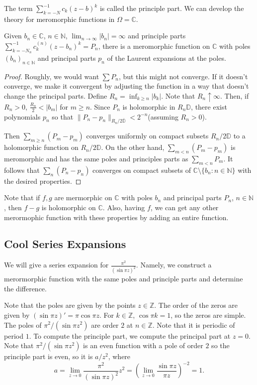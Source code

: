 \documentclass[12pt]{scrartcl}
\newcommand{\N}{\mathbb{N}}
\newcommand{\Z}{\mathbb{Z}}
\newcommand{\C}{\mathbb C}
\newcommand{\D}{\mathbb D}
\let \ol \overline
\begin{document}
The term $\sum_{k=-N}^{-1} c_k(z - b)^k$ is called the principle part.  We can develop the theory for meromorphic functions in $\Omega = \C$. 
\begin{theorem} Given $b_n \in \C$, $n \in \N$, $\lim_{n \to \infty} |b_n| = \infty$ and principle parts $\sum_{k = -N_n}^{-1} c_k^{(n)}(z - b_n)^k = P_n$, there is a meromorphic function on $\C$ with poles $(b_n)_{n \in \N}$ and principal parts $p_n$ of the Laurent expansions at the poles.
\end{theorem}
\begin{proof}
Roughly, we would want $\sum P_n$, but this might not converge.  If it doesn't converge, we make it convergent by adjusting the function in a way that doesn't change the principal parts.  Define $R_n = \inf_{k \ge n} |b_k|$.  Note that $R_n \uparrow \infty$.  Then, if $R_n > 0$, $\frac{R_n}{2} < |b_m|$ for $m \ge n$.  Since $P_n$ is holomorphic in $R_n\D$, there exist polynomials $p_n$ so that $\|P_n - p_n \|_{R_n/2 \ol{\D}} < 2^{-n}$(assuming $R_n > 0$).

Then $\sum_{m \ge n} (P_m - p_m)$ converges uniformly on compact subsets $R_n/2 \D$ to a holomorphic function on $R_n/2 \D$.  On the other hand, $\sum_{m < n} (P_m - p_m)$ is meromorphic and has the same poles and principles parts as $\sum_{m < n} P_m $.  It follows that $\sum_n (P_n - p_n)$ converges on compact subsets of $\C \setminus \{b_n : n \in \N\}$ with the desired properties.
\end{proof}
\begin{remark} Note that if $f, g$ are mermorphic on $\C$ with poles $b_n$ and principal parts $P_n$, $n \in \N$, then $f - g$ is holomorphic on $\C$.  Also, having $f$, we can get any other merormophic function with these properties by adding an entire function.
\end{remark}
\subsection{Cool Series Expansions}
We will give a series expansion for $\frac{\pi^2}{(\sin{\pi z})^2}$.  Namely, we construct a merormorphic function with the same poles and principle parts and determine the difference.  

Note that the poles are given by the points $z \in \Z$.  The order of the zeros are given by $(\sin{\pi z})' = \pi \cos{\pi z}$.  For $k \in \Z$, $\cos{\pi k} = 1$, so the zeros are simple.  The poles of $\pi^2/(\sin{\pi z}^2)$ are order $2$ at $n \in \Z$.  Note that it is periodic of period $1$.  To compute the principle part, we compute the principal part at $z = 0$.  Note that $\pi^2/(\sin{\pi z}^2)$ is an even function with a pole of order $2$ so the principle part is even, so it is $a/z^2$, where
$$a = \lim_{z \to 0} \frac{\pi^2}{(\sin{\pi z})^2} z^2 = (\lim_{z \to 0} \frac{\sin{\pi z}}{\pi z})^{-2} = 1.$$
\end{document}
